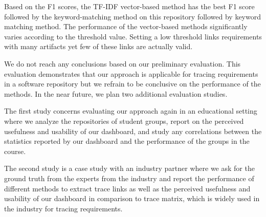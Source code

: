 Based on the F1 scores, the TF-IDF vector-based method has the best F1 score followed by the keyword-matching method on this repository followed by keyword matching method. The performance of the vector-based methods  significantly varies according to the threshold value. Setting a low threshold links requirements with many artifacts yet few of these links are actually valid.

We do not reach any conclusions based on our preliminary evaluation. This evaluation demonstrates that our approach is applicable for tracing requirements in a software repository but we refrain to be conclusive on the performance of the methods. In the near future, we plan two additional evaluation studies.

The first study concerns evaluating our approach again in an educational setting where we analyze the repositories of student groups, report on the perceived usefulness and usability of our dashboard, and study any correlations between the statistics reported by our dashboard and the performance of the groups in the course.

The second study is a case study with an industry partner where we ask for the ground truth from the experts from the industry and report the performance of different methods to extract trace links as well as the perceived usefulness and usability of our dashboard in comparison to trace matrix, which is widely used in the industry for tracing requirements.

